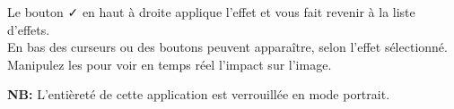 \begin{center}
\begin{minipage}{.48\textwidth}
        Le bouton {\faCheck} en haut à droite applique l'effet et vous fait revenir à la liste d'effets.
        \\

        En bas des curseurs ou des boutons peuvent apparaître, selon l'effet sélectionné. Manipulez les pour voir en temps réel l'impact sur l'image.
    \end{minipage}
\end{center}

\vspace{2cm}
\textbf{NB:} L'entièreté de cette application est verrouillée en mode portrait.
